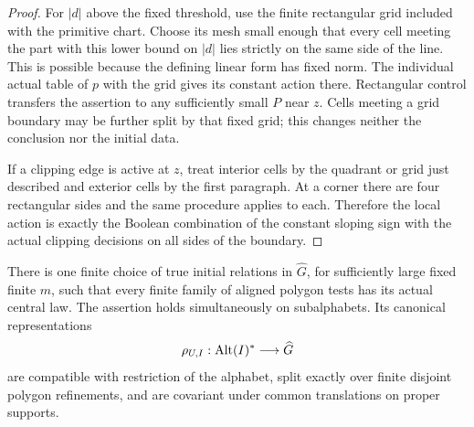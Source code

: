 \begin{proof}
For $|d|$ above the fixed threshold, use the finite rectangular
grid included with the primitive chart.  Choose its mesh small
enough that every cell meeting the part with this lower bound
on $|d|$ lies strictly on the same side of the line.  This is
possible because the defining linear form has fixed norm.
The individual actual table of $p$ with the grid gives its
constant action there.  Rectangular control transfers the
assertion to any sufficiently small $P$ near $z$.  Cells
meeting a grid boundary may be further split by that fixed
grid; this changes neither the conclusion nor the initial
data.

If a clipping edge is active at $z$, treat interior cells by
the quadrant or grid just described and exterior cells by
the first paragraph.  At a corner there are four rectangular
sides and the same procedure applies to each.  Therefore the
local action is exactly the Boolean combination of the
constant sloping sign with the actual clipping decisions on
all sides of the boundary.
\end{proof}

\begin{theorem}\label{thm:polygon-law}
There is one finite choice of true initial relations in
$\widehat G$, for sufficiently large fixed finite $m$, such
that every finite family of aligned polygon tests has its
actual central law.  The assertion holds simultaneously on
subalphabets.  Its canonical representations
\[
 \rho_{U,I}:\operatorname{Alt}(I)^\ast\longrightarrow\widehat G
\]
are compatible with restriction of the alphabet, split
exactly over finite disjoint polygon refinements, and are
covariant under common translations on proper supports.
\end{theorem}

